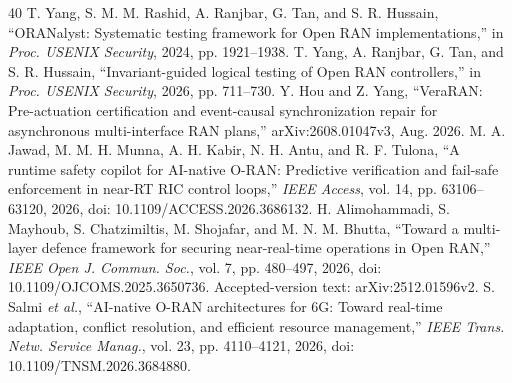 \documentclass[journal]{IEEEtran}
\newif\ifshowrevisions
\newenvironment{revision}{\begingroup\ifshowrevisions\color{blue}\else\color{black}\fi}{\endgroup}
\begin{document}
\begin{thebibliography}{40}
\begin{revision}
 T. Yang, S. M. M. Rashid, A. Ranjbar, G. Tan, and
S. R. Hussain, ``ORANalyst: Systematic testing framework for Open RAN
implementations,'' in \emph{Proc. USENIX Security}, 2024, pp. 1921--1938.
 T. Yang, A. Ranjbar, G. Tan, and S. R. Hussain,
``Invariant-guided logical testing of Open RAN controllers,'' in
\emph{Proc. USENIX Security}, 2026, pp. 711--730.
 Y. Hou and Z. Yang, ``VeraRAN: Pre-actuation certification
and event-causal synchronization repair for asynchronous multi-interface RAN
plans,'' arXiv:2608.01047v3, Aug. 2026.
 M. A. Jawad, M. M. H. Munna, A. H. Kabir,
N. H. Antu, and R. F. Tulona, ``A runtime safety copilot for AI-native O-RAN:
Predictive verification and fail-safe enforcement in near-RT RIC control
loops,'' \emph{IEEE Access}, vol. 14, pp. 63106--63120, 2026,
doi: 10.1109/ACCESS.2026.3686132.
 H. Alimohammadi, S. Mayhoub, S. Chatzimiltis,
M. Shojafar, and M. N. M. Bhutta, ``Toward a multi-layer defence framework
for securing near-real-time operations in Open RAN,'' \emph{IEEE Open J.
Commun. Soc.}, vol. 7, pp. 480--497, 2026,
doi: 10.1109/OJCOMS.2025.3650736. Accepted-version text:
arXiv:2512.01596v2.
 S. Salmi \emph{et al.}, ``AI-native O-RAN
architectures for 6G: Toward real-time adaptation, conflict resolution,
and efficient resource management,'' \emph{IEEE Trans. Netw. Service Manag.},
vol. 23, pp. 4110--4121, 2026, doi: 10.1109/TNSM.2026.3684880.
\end{revision}
\end{thebibliography}
\end{document}
